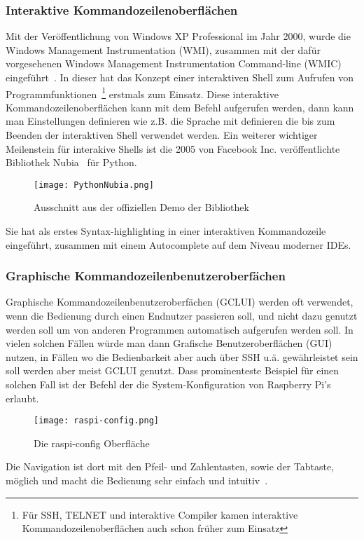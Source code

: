   \subsubsection{Interaktive Kommandozeilenoberflächen}
  Mit der Veröffentlichung von Windows XP Professional im Jahr 2000, wurde die Windows Management Instrumentation (WMI),
  zusammen mit der dafür vorgesehenen Windows Management Instrumentation Command-line (WMIC) eingeführt~\cite{WMIProgrammingBlogPost}.
  In dieser hat das Konzept einer interaktiven Shell zum Aufrufen von
  Programmfunktionen~\footnote{Für SSH, TELNET und interaktive Compiler kamen interaktive Kommandozeilenoberflächen auch schon früher zum Einsatz} erstmals zum Einsatz.
  Diese interaktive Kommandozeilenoberflächen kann mit dem  Befehl aufgerufen werden, dann kann man Einstellungen definieren wie
  z.B. die Sprache mit  definieren die bis zum Beenden der interaktiven Shell verwendet werden.
  Ein weiterer wichtiger Meilenstein für interakive Shells ist die 2005 von Facebook Inc. veröffentlichte Bibliothek Nubia~\cite{NubiaReleaseBlogPost} für Python.
  \begin{figure}[H]
	\texttt{[image: PythonNubia.png]}
	\caption{Ausschnitt aus der offiziellen Demo der Bibliothek}
	\label{fig:PythonNubia}
  \end{figure}
  Sie hat als erstes Syntax-highlighting in einer interaktiven Kommandozeile eingeführt, zusammen mit einem Autocomplete auf dem Niveau moderner IDEs.
  \subsubsection{Graphische Kommandozeilenbenutzeroberfächen}
  Graphische Kommandozeilenbenutzeroberfächen (GCLUI) werden oft verwendet, wenn die Bedienung durch einen Endnutzer passieren soll,
  und nicht dazu genutzt werden soll um von anderen Programmen automatisch aufgerufen werden soll.
  In vielen solchen Fällen würde man dann Grafische Benutzeroberflächen (GUI) nutzen, in Fällen wo die Bedienbarkeit aber auch über SSH u.ä. gewährleistet sein soll werden aber meist GCLUI genutzt.
  Dass prominenteste Beispiel für einen solchen Fall ist der  Befehl der die System-Konfiguration von Raspberry Pi's erlaubt.
  \begin{figure}[H]
	\texttt{[image: raspi-config.png]}
	\caption{Die raspi-config Oberfläche}
	\label{fig:raspi-config}
  \end{figure}
  Die Navigation ist dort mit den Pfeil- und Zahlentasten, sowie der Tabtaste, möglich und macht die Bedienung sehr einfach und intuitiv~\cite{RaspiConfigOfficialInfo}.
